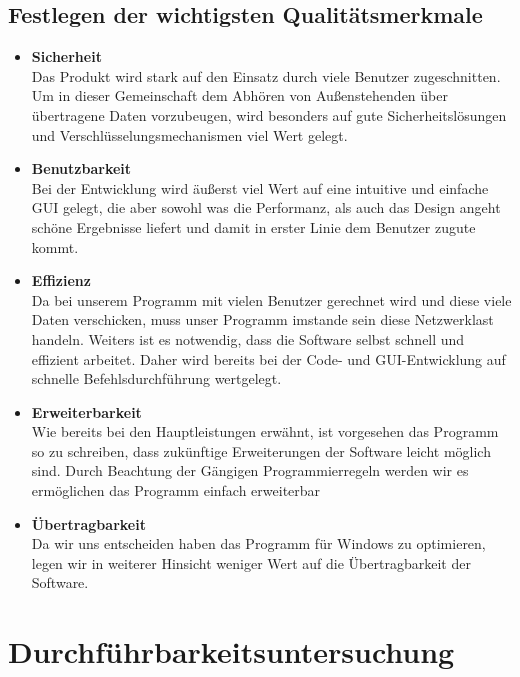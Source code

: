 \documentclass[a4paper,12pt]{scrreprt}
\begin{document}
	
		
	\section{Festlegen der wichtigsten Qualit\"atsmerkmale}
		\begin{itemize}
			\item {\LARGE\textbf{Sicherheit}}\\
		Das Produkt wird stark auf den Einsatz durch viele Benutzer zugeschnitten. Um in dieser Gemeinschaft dem Abhören von Außenstehenden über übertragene Daten vorzubeugen, wird besonders auf gute Sicherheitslösungen und Verschlüsselungsmechanismen viel Wert gelegt. 
			\item {\LARGE\textbf{Benutzbarkeit}}\\
			Bei der Entwicklung wird äußerst viel Wert auf eine intuitive und einfache GUI gelegt, die aber sowohl was die Performanz, als auch das Design angeht schöne Ergebnisse liefert und damit in erster Linie dem Benutzer zugute kommt. 
			
			\item {\LARGE\textbf{Effizienz}}\\
		Da bei unserem Programm  mit vielen Benutzer gerechnet wird und diese  viele Daten verschicken, muss unser Programm  imstande sein diese Netzwerklast handeln. Weiters ist es notwendig, dass die Software selbst schnell und effizient arbeitet. Daher wird bereits bei der Code- und GUI-Entwicklung auf schnelle Befehlsdurchführung wertgelegt.
		
		
			\item {\LARGE\textbf{Erweiterbarkeit}}\\
		Wie bereits bei den Hauptleistungen erwähnt, ist vorgesehen das Programm so zu schreiben, dass zukünftige Erweiterungen der Software leicht möglich sind. Durch Beachtung der Gängigen Programmierregeln werden wir es ermöglichen das Programm einfach erweiterbar 
		
			\item {\LARGE\textbf{Übertragbarkeit}}	\\
			Da wir uns entscheiden haben das Programm für Windows zu optimieren, legen wir in weiterer Hinsicht weniger Wert auf die Übertragbarkeit der Software.
			
			\end{itemize}
\chapter{Durchf\"uhrbarkeitsuntersuchung}
	
\end{document}
